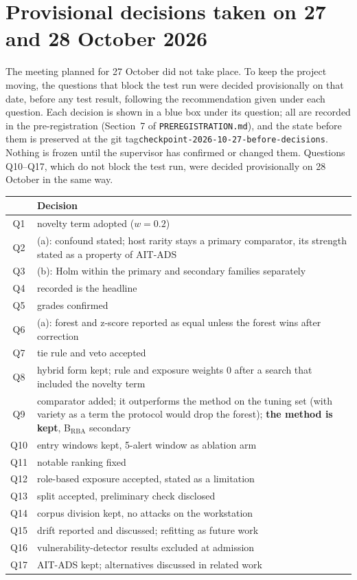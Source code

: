 \documentclass[10.5pt,a4paper]{article}
\begin{document}
\section*{Provisional decisions taken on 27 and 28 October 2026}

The meeting planned for 27 October did not take place. To keep the project moving, the questions that block the test run were decided provisionally on that date, before any test result, following the recommendation given under each question. Each decision is shown in a blue box under its question; all are recorded in the pre-registration (Section~7 of \texttt{PREREGISTRATION.md}), and the state before them is preserved at the git tag\linebreak \texttt{checkpoint-2026-10-27-before-decisions}. Nothing is frozen until the supervisor has confirmed or changed them. Questions Q10--Q17, which do not block the test run, were decided provisionally on 28 October in the same way.

\begin{center}\small
\begin{tabularx}{\linewidth}{@{}c X@{}}
\toprule
& \textbf{Decision} \\
\midrule
Q1 & novelty term adopted ($w = 0.2$) \\
Q2 & (a): confound stated; host rarity stays a primary comparator, its strength stated as a property of AIT-ADS \\
Q3 & (b): Holm within the primary and secondary families separately \\
Q4 & recorded is the headline \\
Q5 & grades confirmed \\
Q6 & (a): forest and z-score reported as equal unless the forest wins after correction \\
Q7 & tie rule and veto accepted \\
Q8 & hybrid form kept; rule and exposure weights 0 after a search that included the novelty term \\
Q9 & comparator added; it outperforms the method on the tuning set (with variety as a term the protocol would drop the forest); \textbf{the method is kept}, B$_\mathrm{RBA}$ secondary \\
\midrule
Q10 & entry windows kept, 5-alert window as ablation arm \\
Q11 & notable ranking fixed \\
Q12 & role-based exposure accepted, stated as a limitation \\
Q13 & split accepted, preliminary check disclosed \\
Q14 & corpus division kept, no attacks on the workstation \\
Q15 & drift reported and discussed; refitting as future work \\
Q16 & vulnerability-detector results excluded at admission \\
Q17 & AIT-ADS kept; alternatives discussed in related work \\
\bottomrule
\end{tabularx}
\end{center}
\end{document}
